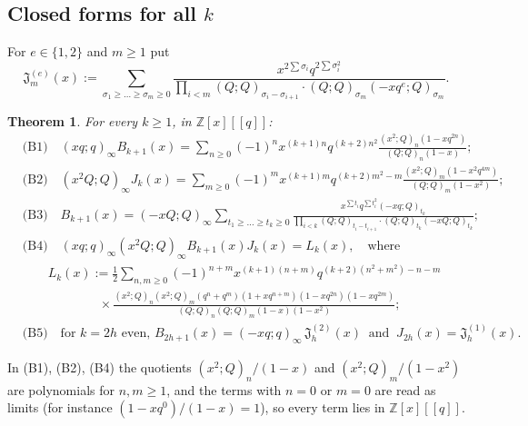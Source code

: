 \documentclass[11pt]{amsart}
\newtheorem{theorem}{Theorem}[section]
\theoremstyle{definition}
\numberwithin{equation}{section}
\newcommand{\Z}{\mathbb{Z}}
\begin{document}
\subsection{Closed forms for all \texorpdfstring{$k$}{k}}\label{ssec:closed}
For $e\in\{1,2\}$ and $m\ge1$ put
\[
\mathfrak J^{(e)}_m(x):=\sum_{\sigma_1\ge\dots\ge\sigma_m\ge0}\frac{x^{2\sum\sigma_i}q^{2\sum\sigma_i^2}}{\prod_{i<m}(Q;Q)_{\sigma_i-\sigma_{i+1}}\cdot(Q;Q)_{\sigma_m}(-xq^e;Q)_{\sigma_m}} .
\]

\begin{theorem}\label{thm:B}
For every $k\ge1$, in $\Z[x][[q]]$:
\begin{align*}
&\text{(B1)}\quad (xq;q)_\infty B_{k+1}(x)=\sum_{n\ge0}(-1)^nx^{(k+1)n}q^{(k+2)n^2}\frac{(x^2;Q)_n(1-xq^{2n})}{(Q;Q)_n(1-x)};\\
&\text{(B2)}\quad (x^2Q;Q)_\infty J_k(x)=\sum_{m\ge0}(-1)^mx^{(k+1)m}q^{(k+2)m^2-m}\frac{(x^2;Q)_m(1-x^2q^{4m})}{(Q;Q)_m(1-x^2)};\\
&\text{(B3)}\quad B_{k+1}(x)=(-xQ;Q)_\infty\sum_{t_1\ge\dots\ge t_k\ge0}\frac{x^{\sum t_i}q^{\sum t_i^2}(-xq;Q)_{t_k}}{\prod_{i<k}(Q;Q)_{t_i-t_{i+1}}\cdot(Q;Q)_{t_k}(-xQ;Q)_{t_k}};\\
&\text{(B4)}\quad (xq;q)_\infty(x^2Q;Q)_\infty B_{k+1}(x)J_k(x)=L_k(x),\quad\text{where}\\
&\qquad L_k(x):=\tfrac12\sum_{n,m\ge0}(-1)^{n+m}x^{(k+1)(n+m)}q^{(k+2)(n^2+m^2)-n-m}\\
&\qquad\qquad\qquad\times\frac{(x^2;Q)_n(x^2;Q)_m(q^n+q^m)(1+xq^{n+m})(1-xq^{2n})(1-xq^{2m})}{(Q;Q)_n(Q;Q)_m(1-x)(1-x^2)};\\
&\text{(B5)}\quad\text{for }k=2h\text{ even, } B_{2h+1}(x)=(-xq;q)_\infty\,\mathfrak J^{(2)}_h(x)\ \text{ and }\ J_{2h}(x)=\mathfrak J^{(1)}_h(x).
\end{align*}
\end{theorem}
In (B1), (B2), (B4) the quotients $(x^2;Q)_n/(1-x)$ and $(x^2;Q)_m/(1-x^2)$ are polynomials for $n,m\ge1$,
and the terms with $n=0$ or $m=0$ are read as limits (for instance $(1-xq^{0})/(1-x)=1$), so every term
lies in $\Z[x][[q]]$.
\end{document}
